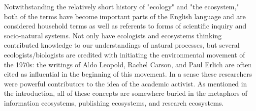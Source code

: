  Notwithstanding the relatively short history of "ecology" and "the ecosystem," both of the terms have become important parts of the English language and are considered household terms as well as referents to forms of scientific inquiry and socio-natural systems. Not only have ecologists and ecosystems thinking contributed knowledge to our understandings of natural processes, but several ecologists/biologists are credited with initiating the environmental movement of the 1970s: the writings of Aldo Leopold, Rachel Carson, and Paul Erlich are often cited as influential in the beginning of this movement. In a sense these researchers were powerful contributors to the idea of the academic activist. As mentioned in the introduction, all of these concepts are somewhere buried in the metaphors of information ecosystems, publishing ecosystems, and research ecosystems.


